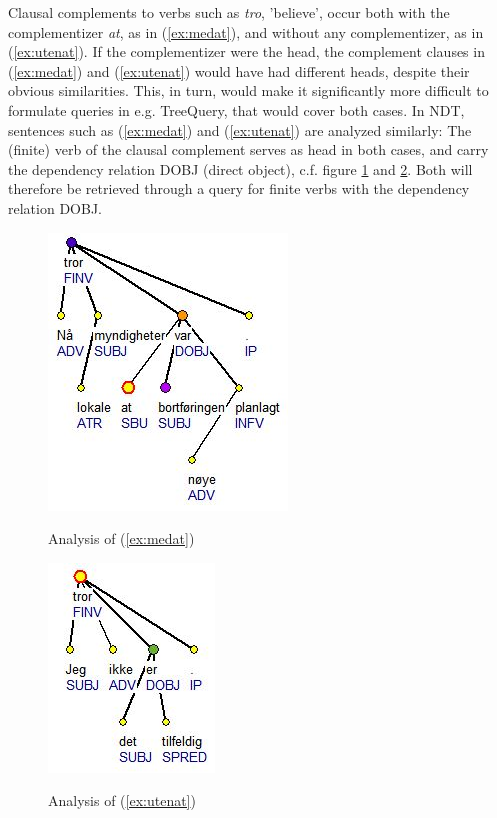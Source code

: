 \documentclass[11pt,a4paper]{article}
\begin{document}
Clausal complements to verbs such as \emph{tro}, 'believe', occur both with the complementizer \emph{at}, as in (\ref{ex:medat}), and without any complementizer, as in (\ref{ex:utenat}). If the complementizer were the head, the complement clauses in (\ref{ex:medat}) and (\ref{ex:utenat}) would have had different heads, despite their obvious similarities. This, in turn, would make it significantly more difficult to formulate queries in e.g. TreeQuery, that would cover both cases.
In NDT, sentences such as (\ref{ex:medat}) and (\ref{ex:utenat}) are analyzed similarly: The (finite) verb of the clausal complement serves as head in both cases, and carry the dependency relation DOBJ (direct object), c.f. figure \ref{figure:medat} and \ref{figure:utenat}. Both will therefore be retrieved through a query for finite verbs with the dependency relation DOBJ.

\begin{figure}[h!]
  \caption{Analysis of (\ref{ex:medat})}
  \centering
    \includegraphics{medat.jpg}
\label{figure:medat}
\end{figure}

\begin{figure}[h!]
  \caption{Analysis of (\ref{ex:utenat})}
  \centering
    \includegraphics{utenat.jpg}
\label{figure:utenat}
\end{figure}
\end{document}
